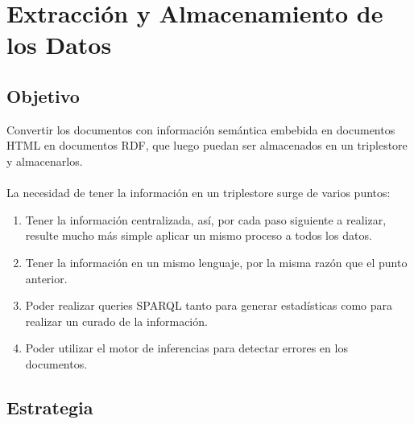\chapter{Extracción y Almacenamiento de los Datos}
\label{chapter:extraccion}

\section{Objetivo}

\noindent Convertir los documentos con información semántica embebida en documentos HTML en documentos RDF, que luego puedan ser 
almacenados en un triplestore y almacenarlos.
\\\\
La necesidad de tener la información en un triplestore surge de varios puntos:
\begin{enumerate}
 \item Tener la información centralizada, así, por cada paso siguiente a realizar, resulte mucho más simple aplicar un mismo proceso a todos los datos.
 \item Tener la información en un mismo lenguaje, por la misma razón que el punto anterior.
 \item Poder realizar queries SPARQL tanto para generar estadísticas como para realizar un curado de la información.
 \item Poder utilizar el motor de inferencias para detectar errores en los documentos.
\end{enumerate}

\section{Estrategia}

